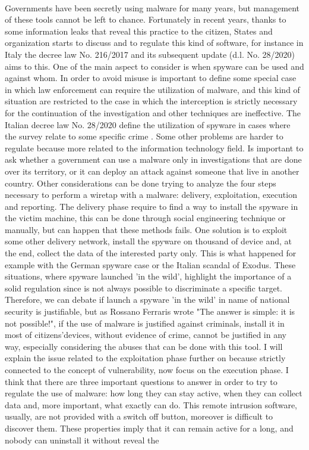 \paragraph{}
Governments have been secretly using malware for many years, but management of these tools cannot be left to chance. Fortunately in recent years, thanks to some information leaks that reveal this practice to the citizen, States and organization starts to discuss and to regulate this kind of software, for instance in Italy the decree law No. 216/2017\cite{dl_216/2017} and its subsequent update (d.l. No. 28/2020\cite{dl_28/2020}) aims to this. One of the main aspect to consider is when spyware can be used and against whom. In order to avoid misuse is important to define some special case in which law enforcement can require the utilization of malware, and this kind of situation are restricted to the case in which the interception is strictly necessary for the continuation of the investigation and other techniques are ineffective. The Italian decree law No. 28/2020 define the utilization of spyware in cases where the survey relate to some specific crime \cite{28/2020_ref}. Some other problems are harder to regulate because more related to the information technology field. Is important to ask whether a government can use a malware only in investigations that are done over its territory, or it can deploy an attack against someone that live in another country. Other considerations can be done trying to analyze the four steps necessary to perform a wiretap with a malware: delivery, exploitation, execution and reporting. The delivery phase require to find a way to install the spyware in the victim machine, this can be done through social engineering technique or manually, but can happen that these methods fails. One solution is to exploit some other delivery network, install the spyware on thousand of device and, at the end, collect the data of the interested party only. This is what happened for example with the German spyware case\cite{R2D2} or the Italian scandal of Exodus\cite{exodus}. These situations, where spyware launched 'in the wild', highlight the importance of a solid regulation since is not always possible to discriminate a specific target. Therefore, we can debate if launch a spyware 'in the wild' in name of national security is justifiable, but as Rossano Ferraris wrote "The answer is simple: it is not possible!"\cite{rossano_ferraris}, if the use of malware is justified against criminals, install it in most of citizens'devices, without evidence of crime, cannot be justified in any way, especially considering the abuses that can be done with this tool. I will explain the issue related to the exploitation phase further on because strictly connected to the concept of vulnerability, now focus on the execution phase. I think that there are three important questions to answer in order to try to regulate the use of malware: how long they can stay active, when they can collect data and, more important, what exactly can do. This remote intrusion software, usually, are not provided with a switch off button, moreover is difficult to discover them. These properties imply that it can remain active for a long, and nobody can uninstall it without reveal the 